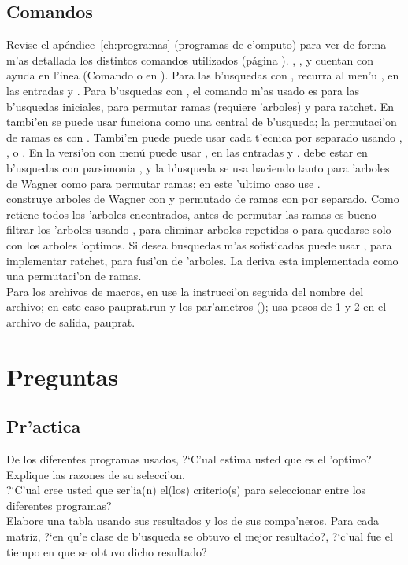 \subsection{Comandos}
\noindent
Revise el ap\'endice~\ref{ch:programas} (programas de c'omputo) para ver de
forma m'as detallada los distintos comandos utilizados (p\'agina
\pageref{ch:programas}). , ,  y 
cuentan con ayuda en l'inea (Comando  o  en ).
Para las b'usquedas con , recurra al men'u , en las
entradas  y . Para b'usquedas con , el
comando m'as usado es   para las b'usquedas iniciales, 
para permutar ramas (requiere 'arboles) y   para ratchet. En
 tambi'en se puede usar  funciona como una central de
b'usqueda; la permutaci'on de ramas es con . Tambi'en puede puede
usar cada t'ecnica por separado usando , , o
. En la versi'on con men\'u puede usar , en las entradas
 y .  debe estar
en b'usquedas con parsimonia , y la b'usqueda se
usa haciendo   tanto para 'arboles de Wagner como para permutar
ramas; en este 'ultimo caso use .\\
 construye arboles de Wagner con  y permutado de ramas
con  por separado. Como  retiene todos los 'arboles
encontrados, antes de permutar las ramas es bueno filtrar los 'arboles usando
, para eliminar arboles repetidos o  para
quedarse solo con los arboles 'optimos. Si desea busquedas m'as sofisticadas
puede usar , para implementar ratchet,  para fusi'on
de 'arboles. La deriva esta implementada como una permutaci'on de ramas.\\
Para los archivos de macros, en  use la instrucci'on 
seguida del nombre del archivo; en este caso pauprat.run y los par'ametros
();  usa pesos de 1 y 2 en el archivo de
salida, pauprat.

\section{Preguntas}
\subsection{Pr'actica}
\noindent
De los diferentes programas usados, ?`C'ual estima usted que es el 'optimo?
Explique las razones de su selecci'on.\\
?`C'ual cree usted que ser'ia(n) el(los) criterio(s) para seleccionar entre los
diferentes programas?\\ 
Elabore una tabla usando sus resultados y los de sus compa'neros. Para cada
matriz, ?`en qu'e clase de b'usqueda se obtuvo el mejor resultado?, ?`c'ual fue
el tiempo en que se obtuvo dicho resultado?
